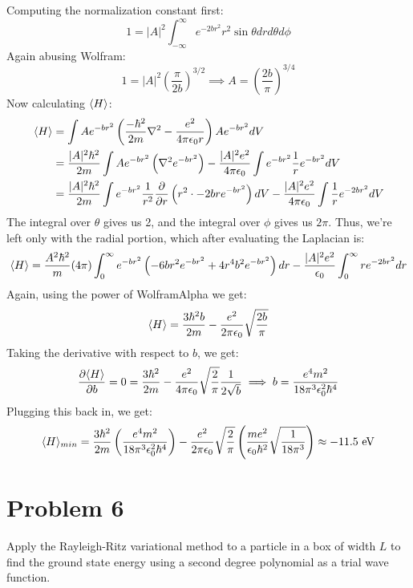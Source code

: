 \documentclass[10pt]{article}
\begin{document}
	\begin{solution}
		Computing the normalization constant first:
		\[ 1 = |A|^2 \int_{-\infty}^\infty e^{-2br^2}r^2 \sin \theta dr d\theta d\phi\]
		Again abusing Wolfram:
		\[ 1 = |A|^2 \left( \frac{\pi}{2b}\right)^{3/2} \implies A = \left( \frac{2b}{\pi}\right)^{3/4}\]
		Now calculating $\langle H \rangle$:
		\begin{align*}
			\langle H \rangle &= \int Ae^{-br^2} \left( \frac{-\hbar^2}{2m}\nabla^2 - \frac{e^2}{4\pi \epsilon_0 r}\right) Ae^{-br^2} dV\\
			&= \frac{|A|^2\hbar^2}{2m} \int Ae^{-br^2}\left( \nabla^2 e^{-br^2}\right) - \frac{|A|^2e^2}{4\pi \epsilon_0} \int e^{-br^2}\frac 1r e^{-br^2} dV\\
			&= \frac{|A|^2 \hbar^2}{2m} \int e^{-br^2} \frac{1}{r^2} \pdv{r}\left( r^2 \cdot -2br e^{-br^2}\right) dV - \frac{|A|^2e^2}{4\pi \epsilon_0} \int \frac 1r e^{-2br^2} dV
		\end{align*}
		The integral over $\theta$ gives us 2, and the integral over $\phi$ gives us $2\pi$. Thus, we're left only with the radial portion, which after evaluating the Laplacian is: 
		\[ \langle H \rangle = \frac{A^2\hbar^2}{m}(4\pi)\int_0^\infty e^{-br^2}\left(-6br^2 e^{-br^2} + 4r^4 b^2 e^{-br^2}\right) dr - \frac{|A|^2e^2}{\epsilon_0}\int_0^\infty re^{-2br^2} dr\] 
		Again, using the power of WolframAlpha we get: 
		\[ \langle H \rangle = \frac{3\hbar^2b}{2m} - \frac{e^2}{2\pi \epsilon_0} \sqrt{\frac{2b}{\pi}}\]
		Taking the derivative with respect to $b$, we get: 
		\[ \pdv{\langle H \rangle}{b}= 0 = \frac{3\hbar^2}{2m} - \frac{e^2}{4\pi \epsilon_0} \sqrt{\frac{2}{\pi}} \frac{1}{2\sqrt{b}} \implies b = \frac{e^4m^2}{18\pi^3\epsilon_0^2 \hbar^4}\]
		Plugging this back in, we get: 
		\[ \langle H \rangle_{min} = \frac{3\hbar^2}{2m}\left( \frac{e^4m^2}{18 \pi^3 \epsilon_0^2\hbar^4}\right) - \frac{e^2}{2\pi \epsilon_0} \sqrt{\frac{2}{\pi}}\left( \frac{me^2}{\epsilon_0 \hbar^2} \sqrt{\frac{1}{18\pi^3}}\right) \approx -11.5 \text{ eV}\]
	\end{solution}

	\pagebreak

	\section*{Problem 6}
	Apply the Rayleigh-Ritz variational method to a particle in a box of width $L$ to find the ground state energy using a second degree polynomial as a trial wave function.
\end{document}
